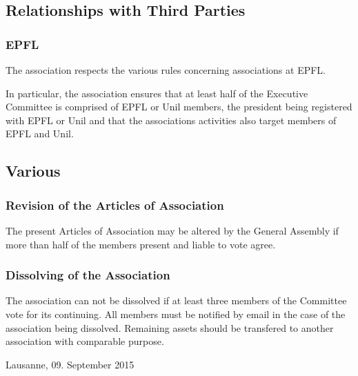 \documentclass[12pt,a4paper,oneside]{article}
\newcounter{art}
\newcommand{\english}{    \switchcolumn[0]\noindent}
\begin{document}
\begin{paracol}{2}
\english
	\subsection{Relationships with Third Parties}

	\subsubsection{EPFL}
	The association respects the various rules concerning associations at EPFL.

	In particular, the association ensures that at least half of the Executive Committee is comprised of EPFL or Unil members, the president being registered with EPFL or Unil and that the associations activities also target members of EPFL and Unil. 




\english
	\subsection{Various}

	\english
	\subsubsection{Revision of the Articles of Association}\stepcounter{art}
	The present Articles of Association may be altered by the General Assembly if more than half of the members present and liable to vote agree. 

	\english
	\subsubsection{Dissolving of the Association}\stepcounter{art}
	The association can not be dissolved if at least three members of the Committee vote for its continuing.
	All members must be notified by email in the case of the association being dissolved.
	Remaining assets should be transfered to another association with comparable purpose.


\english
	\vspace{\fill}
	
	\noindent
	Lausanne, 09. September 2015
	\vspace {1.5cm}

	\noindent
	\hrulefill \\
 
	\vspace {1.0cm}
 	\noindent 
 	\hrulefill \\
 	

 	

	
	

\clearpage





\end{paracol}
\end{document}

